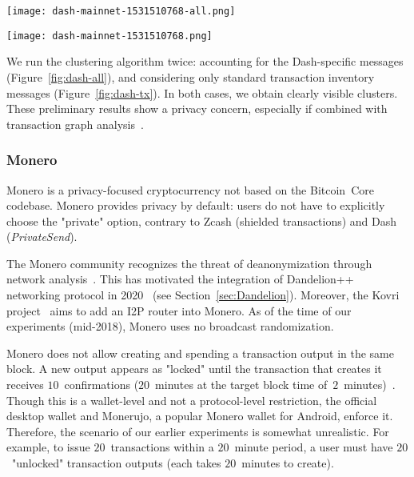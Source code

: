\begin{figure*}
	\centering
	\begin{minipage}{0.5\textwidth}
		\centering
		\texttt{[image: dash-mainnet-1531510768-all.png]}
		\caption{Transaction clustering for Dash (messages and transactions).}
		\label{fig:dash-all}
	\end{minipage}\hfill
	\begin{minipage}{0.5\textwidth}
		\centering
		\texttt{[image: dash-mainnet-1531510768.png]}
		\caption{Transaction clustering for Dash (transactions only).}
		\label{fig:dash-tx}
	\end{minipage}\hfill
\end{figure*}

We run the clustering algorithm twice: accounting for the Dash-specific messages (Figure~\ref{fig:dash-all}), and considering only standard transaction inventory messages (Figure~\ref{fig:dash-tx}).
In both cases, we obtain clearly visible clusters.
These preliminary results show a privacy concern, especially if combined with transaction graph analysis~\cite{Kalodner2017}. 


\subsubsection{Monero}

Monero is a privacy-focused cryptocurrency not based on the Bitcoin~Core codebase.
Monero provides privacy by default: users do not have to explicitly choose the "private" option, contrary to Zcash (shielded transactions) and Dash (\textit{PrivateSend}).

The Monero community recognizes the threat of deanonymization through network analysis~\cite{user36432017, manontheinside2016, expez2016, Cameron2016}.
This has motivated the integration of Dandelion++ networking protocol in 2020~\cite{ErCiccione2020} (see Section~\ref{sec:Dandelion}).
Moreover, the Kovri project~\cite{Kovri} aims to add an I2P router into Monero.
As of the time of our experiments (mid-2018), Monero uses no broadcast randomization.

Monero does not allow creating and spending a transaction output in the same block.
A new output appears as "locked" until the transaction that creates it receives $10$~confirmations ($20$~minutes at the target block time of~$2$~minutes)~\cite{dpzz2017}.
Though this is a wallet-level and not a protocol-level restriction, the official desktop wallet and Monerujo, a popular Monero wallet for Android, enforce it.
Therefore, the scenario of our earlier experiments is somewhat unrealistic.
For example, to issue $20$~transactions within a $20$~minute period, a user must have $20$~"unlocked" transaction outputs (each takes $20$~minutes to create).

